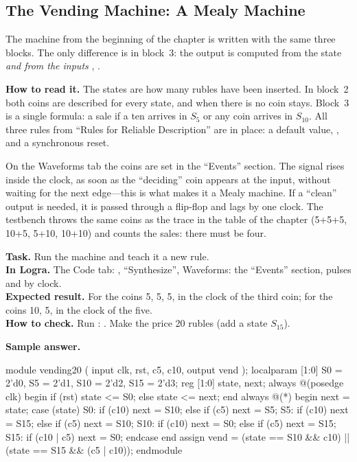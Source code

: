 \subsection{The Vending Machine: A Mealy Machine}

The machine from the beginning of the chapter is written with the same three
blocks. The only difference is in block~3: the output  is computed
from the state \emph{and from the inputs} , .


\textbf{How to read it.} The states are how many rubles have been inserted. In
block~2 both coins are described for every state, and when there is no coin
 stays. Block~3 is a single formula: a sale if a ten arrives
in $S_5$ or any coin arrives in $S_{10}$. All three rules from ``Rules for
Reliable Description'' are in place: a default value, , and a
synchronous reset.


On the Waveforms tab the coins are set in the ``Events'' section. The signal
 rises inside the clock, as soon as the ``deciding'' coin appears at
the input, without waiting for the next edge---this is what makes it a Mealy
machine. If a ``clean'' output is needed, it is passed through a flip-flop and
lags by one clock. The testbench  throws the same
coins as the trace in the table of the chapter (5+5+5, 10+5, 5+10, 10+10) and
counts the sales: there must be four.

\begin{diybox}
\textbf{Task.} Run the machine and teach it a new rule.\\
\textbf{In Logra.} The Code tab: , ``Synthesize'', Waveforms:
the ``Events'' section, pulses  and  by clock.\\
\textbf{Expected result.} For the coins 5, 5, 5,  in the clock of
the third coin; for the coins 10, 5, in the clock of the five.\\
\textbf{How to check.} Run : .
 Make the price 20 rubles (add a state $S_{15}$).
\end{diybox}

\textbf{Sample answer.}
\begin{vcode}
module vending20 (
    input  clk, rst, c5, c10,
    output vend
);
    localparam [1:0] S0 = 2'd0, S5 = 2'd1, S10 = 2'd2, S15 = 2'd3;
    reg [1:0] state, next;
    always @(posedge clk) begin
        if (rst) state <= S0;
        else     state <= next;
    end
    always @(*) begin
        next = state;
        case (state)
            S0:  if (c10) next = S10; else if (c5) next = S5;
            S5:  if (c10) next = S15; else if (c5) next = S10;
            S10: if (c10) next = S0;  else if (c5) next = S15;
            S15: if (c10 | c5) next = S0;
        endcase
    end
    assign vend = (state == S10 && c10) || (state == S15 && (c5 | c10));
endmodule
\end{vcode}


